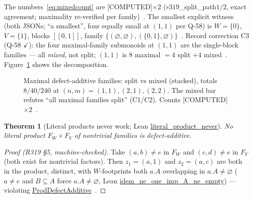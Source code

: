 \documentclass[11pt,a4paper]{article}
\newtheorem{theorem}{Theorem}
\theoremstyle{definition}
\begin{document}
The numbers~\eqref{eq:mixedcount} are [COMPUTED]$\times2$
($r319$\_\allowbreak split\_path$1/2$, exact agreement; maximality
re-verified per family)~\cite{D319}. The smallest explicit witness
(both JSONs; ``a smallest'', four equally small at $(1,1)$ per Q-58) is
$W=\{0\}$, $V=\{1\}$, blocks $[[0,1]]$, family
$\{(\varnothing,\varnothing),(\{0,1\},\varnothing)\}$~\cite{D319}.
Record correction C3 (Q-58 $\checkmark$): the four maximal-family submonoids at
$(1,1)$ are the single-block families — all \emph{mixed}, not split;
$(1,1)$ is $8$ maximal $=4$ split $+4$ mixed~\cite{D319,D322}.
Figure~\ref{fig:split} shows the decomposition.

\begin{figure}[t]
  \centering
  \caption{Maximal defect-additive families: split vs mixed (stacked),
    totals $8/40/240$ at $(n,m)=(1,1),(2,1),(2,2)$. The mixed bar
    refutes ``all maximal families split'' (C1/C2). Counts
    [COMPUTED]$\times2$~\cite{D319}.}
  \label{fig:split}
\end{figure}

\begin{theorem}[Literal products never work; Lean
  \url{literal_product_never}]
  \label{thm:c4}
  No literal product $F_W\times F_V$ of nontrivial families is
  defect-additive.
\end{theorem}

\begin{proof}[Proof (R319 §5, machine-checked)]
Take $(a,b)\ne e$ in $F_W$ and $(c,d)\ne e$ in $F_V$ (both exist for
nontrivial factors). Then $z_1=(a,1)$ and $z_2=(a,c)$ are both in the
product, distinct, with $W$-footprints both $a.A$ overlapping in
$a.A\ne\varnothing$ ($a\ne e$ and $B\subseteq A$ force $a.A\ne\varnothing$,
Lean \url{idem_ne_one_imp_A_ne_empty}) — violating
\url{ProdDefectAdditive}~\cite{D319}.
\end{proof}
\end{document}
